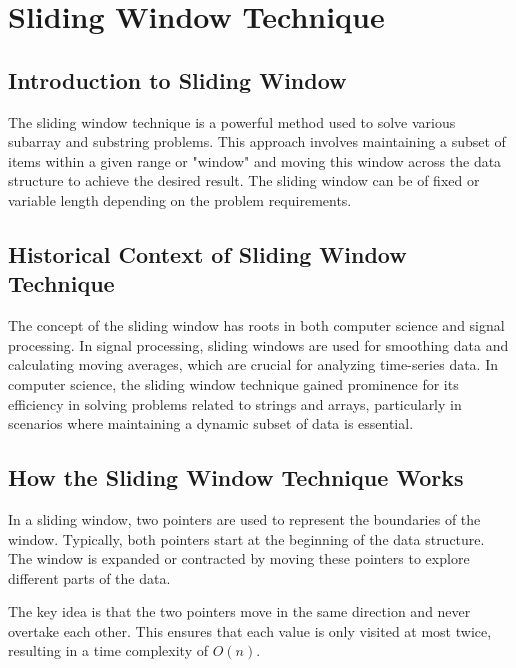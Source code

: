 
\section{Sliding Window Technique}

\subsection*{Introduction to Sliding Window}

The sliding window technique is a powerful method used to solve various subarray and substring problems. This approach involves maintaining a subset of items within a given range or "window" and moving this window across the data structure to achieve the desired result. The sliding window can be of fixed or variable length depending on the problem requirements.

\subsection*{Historical Context of Sliding Window Technique}

The concept of the sliding window has roots in both computer science and signal processing. In signal processing, sliding windows are used for smoothing data and calculating moving averages, which are crucial for analyzing time-series data. In computer science, the sliding window technique gained prominence for its efficiency in solving problems related to strings and arrays, particularly in scenarios where maintaining a dynamic subset of data is essential.

\subsection*{How the Sliding Window Technique Works}

In a sliding window, two pointers are used to represent the boundaries of the window. Typically, both pointers start at the beginning of the data structure. The window is expanded or contracted by moving these pointers to explore different parts of the data.

The key idea is that the two pointers move in the same direction and never overtake each other. This ensures that each value is only visited at most twice, resulting in a time complexity of \(O(n)\).

